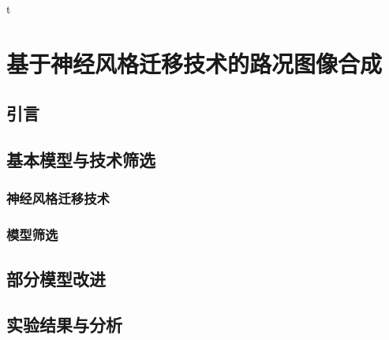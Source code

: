 t\chapter{基于神经风格迁移技术的路况图像合成}

\section{引言}


\section{基本模型与技术筛选}

\subsection{神经风格迁移技术}

\subsection{模型筛选}



\section{部分模型改进}

\section{实验结果与分析}